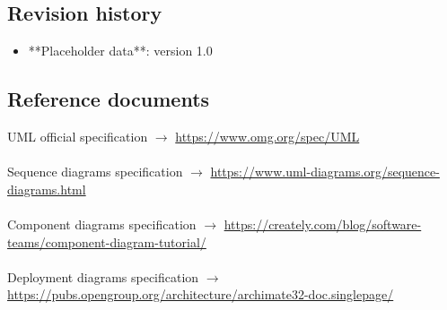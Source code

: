 \documentclass{article}
\begin{document}
{\subsection{Revision history}
\begin{itemize}
    \item **Placeholder data**: version 1.0
\end{itemize}

\subsection{Reference documents}
UML official specification $\rightarrow$ \url{https://www.omg.org/spec/UML}
\\ \\
Sequence diagrams specification $\rightarrow$ \url{https://www.uml-diagrams.org/sequence-diagrams.html}
\\ \\
Component diagrams specification $\rightarrow$ \url{https://creately.com/blog/software-teams/component-diagram-tutorial/}
\\ \\
Deployment diagrams specification $\rightarrow$ \url{https://pubs.opengroup.org/architecture/archimate32-doc.singlepage/}
}
\end{document}
